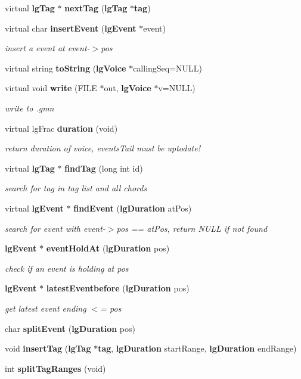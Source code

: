 \begin{CompactItemize}
virtual {\bf lg\-Tag} $\ast$ {\bf next\-Tag} ({\bf lg\-Tag} $\ast${\bf tag})
\item 
virtual char {\bf insert\-Event} ({\bf lg\-Event} $\ast$event)
\begin{CompactList}\small\item\em insert a event at event-$>$pos \item\end{CompactList}\item 
virtual string {\bf to\-String} ({\bf lg\-Voice} $\ast$calling\-Seq=NULL)
\item 
virtual void {\bf write} (FILE $\ast$out, {\bf lg\-Voice} $\ast$v=NULL)
\begin{CompactList}\small\item\em write to .gmn \item\end{CompactList}\item 
virtual lg\-Frac {\bf duration} (void)
\begin{CompactList}\small\item\em return duration of voice, events\-Tail must be uptodate! \item\end{CompactList}\item 
virtual {\bf lg\-Tag} $\ast$ {\bf find\-Tag} (long int id)
\begin{CompactList}\small\item\em search for tag in tag list and all chords \item\end{CompactList}\item 
virtual {\bf lg\-Event} $\ast$ {\bf find\-Event} ({\bf lg\-Duration} at\-Pos)
\begin{CompactList}\small\item\em search for event with event-$>$pos == at\-Pos, return NULL if not found \item\end{CompactList}\item 
{\bf lg\-Event} $\ast$ {\bf event\-Hold\-At} ({\bf lg\-Duration} pos)
\begin{CompactList}\small\item\em check if an event is holding at pos \item\end{CompactList}\item 
{\bf lg\-Event} $\ast$ {\bf latest\-Eventbefore} ({\bf lg\-Duration} pos)
\begin{CompactList}\small\item\em get latest event ending $<$= pos \item\end{CompactList}\item 
char {\bf split\-Event} ({\bf lg\-Duration} pos)
\item 
void {\bf insert\-Tag} ({\bf lg\-Tag} $\ast${\bf tag}, {\bf lg\-Duration} start\-Range, {\bf lg\-Duration} end\-Range)
\item 
int {\bf split\-Tag\-Ranges} (void)
\end{CompactItemize}
